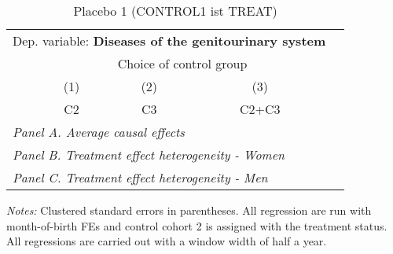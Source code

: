  \begin{table}[H] \centering \begin{threeparttable} \caption{Placebo 1 (CONTROL1 ist TREAT) } {\def\sym#1{\ifmmode^{#1}\else\(^{#1}\)\fi} \begin{tabular}{l*{4}{c}} \toprule \multicolumn{4}{l}{Dep. variable: \textbf{Diseases of the genitourinary system}} \\ & \multicolumn{3}{c}{Choice of control group} \\ \cmidrule(lr){2-4}
            &\multicolumn{1}{c}{(1)}&\multicolumn{1}{c}{(2)}&\multicolumn{1}{c}{(3)}\\
            &\multicolumn{1}{c}{C2}&\multicolumn{1}{c}{C3}&\multicolumn{1}{c}{C2+C3}\\
\midrule
 \multicolumn{4}{l}{\emph{Panel A. Average causal effects}} \\      \midrule\multicolumn{4}{l}{\emph{Panel B. Treatment effect heterogeneity - Women}} \\      \midrule\multicolumn{4}{l}{\emph{Panel C. Treatment effect heterogeneity - Men}} \\      
\bottomrule \end{tabular} } \begin{tablenotes} \item \scriptsize \emph{Notes:} Clustered standard errors in parentheses. All regression are run with month-of-birth FEs and control cohort 2 is assigned with the treatment status. All regressions are carried out with a window width of half a year. \end{tablenotes} \end{threeparttable} \end{table} 
